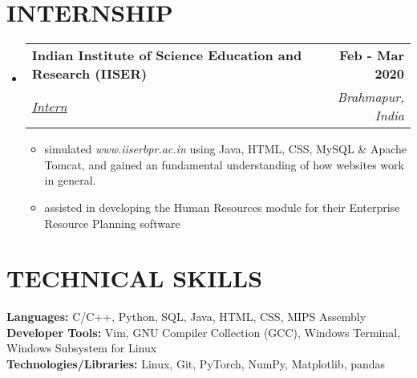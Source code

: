 \documentclass[letterpaper,11pt]{article}
\makeatletter
\newcommand{\resumeItem}[1]{
  \item\small{
    {#1 \vspace{-2pt}}
  }
}
\newcommand{\resumeSubheading}[4]{
  \vspace{-2pt}\item
    \begin{tabular*}{1.0\textwidth}[t]{l@{\extracolsep{\fill}}r}
      \textbf{\large#1} & \textbf{\small #2} \\
      \textit{\large#3} & \textit{\small #4} \\
      
    \end{tabular*}\vspace{-7pt}
}
\newcommand{\resumeSubHeadingListStart}{\begin{itemize}[leftmargin=0.0in, label={}]}
\newcommand{\resumeSubHeadingListEnd}{\end{itemize}}
\newcommand{\resumeItemListStart}{\begin{itemize}}
\newcommand{\resumeItemListEnd}{\end{itemize}\vspace{-5pt}}
\makeatother
\begin{document}
\section{INTERNSHIP}
    \resumeSubHeadingListStart
      \resumeSubheading
        {Indian Institute of Science Education and Research (IISER)}{Feb - Mar 2020}
        {\href{https://drive.google.com/file/d/1MjAsp7TuGCDzTJeRRi4D6GTi0dCwG9xk/view?usp=sharing}{\underline{Intern}} {\raisebox{-0.1\height}\faExternalLink}}{Brahmapur, India}
        \resumeItemListStart
          \resumeItem{\normalsize{simulated \textit{www.iiserbpr.ac.in} using Java, HTML, CSS, MySQL \& Apache Tomcat, and gained an fundamental understanding of how websites work in general.}}
          \resumeItem{\normalsize{assisted in developing the Human Resources module for their Enterprise Resource Planning software}}
        \resumeItemListEnd
    \resumeSubHeadingListEnd
\vspace{-12pt}


\section{TECHNICAL SKILLS}
\begin{itemize}[leftmargin=0.15in, label={}]
  \small{\item{
    \textbf{\normalsize{Languages:}}{ \normalsize{C/C++, Python, SQL, Java, HTML, CSS, MIPS Assembly}} \\
    \textbf{\normalsize{Developer Tools:}}{ \normalsize{Vim, GNU Compiler Collection (GCC), Windows Terminal, Windows Subsystem for Linux}} \\
    \textbf{\normalsize{Technologies/Libraries:}}{\normalsize{ Linux, Git, PyTorch, NumPy, Matplotlib, pandas}} \\
  }}
\end{itemize}
\vspace{-12pt}

 
\end{document}
